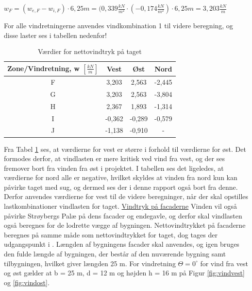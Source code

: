 \begin{center} 
	$w_F=(w_{e,F}-w_{i,F})\cdot 6,\!25 m = (0,\!339 \frac{kN}{m^2}\cdot (-0,\!174 \frac{kN}{m^2})\cdot 6,\!25 m = 3,\!203 \frac{kN}{m}$
\end{center}

For alle vindretningerne anvendes vindkombination 1 til videre beregning, og disse laster ses i tabellen nedenfor! 

\begin{table}[htb]
	\begin{center}
		\begin{tabular}{ |c|c|c|c| } 
			\hline
			Zone/Vindretning, w $[\frac{kN}{m}]$ & Vest & Øst & Nord \\	\hline
			F & 3,203 & 2,563 & -2,445 \\	\hline
			G & 3,203 & 2,563 & -3,804 \\	\hline 
			H & 2,367 & 1,893 & -1,314 \\ 	\hline
			I & -0,362 & -0,289 & -0,579 \\	\hline
			J & -1,138 & -0,910 & - \\	\hline
		\end{tabular}
		\caption{Værdier for nettovindtryk på taget}
		\label{tab:bb}
	\end{center}
\end{table}

Fra Tabel \ref{tab:bb} ses, at værdierne for vest er større i forhold til værdierne for øst. Det formodes derfor, at vindlasten er mere kritisk ved vind fra vest, og der ses fremover bort fra vinden fra øst i projektet. I tabellen ses det ligeledes, at værdierne for nord alle er negative, hvilket skyldes at vinden fra nord kun kan påvirke taget med sug, og dermed ses der i denne rapport også bort fra denne. 
\newline \indent{     }  Derfor anvendes værdierne for vest til de videre beregninger, når der skal opstilles lastkombinationer vindlasten for taget.
\newline
\newline
\underline{Vindtryk på facaderne}
\newline
Vinden vil også påvirke Strøybergs Palæ på dens facader og endegavle, og derfor skal vindlasten også beregnes for de lodrette vægge af bygningen.
\newline \indent{     }  Nettovindtrykket på facaderne beregnes på samme måde som nettovindtrykket for taget, dog tages der udgangspunkt i \citep[ tabel 7.1]{EU91}. Længden af bygningens facader skal anvendes, og igen bruges den fulde længde af bygningen, der består af den nuværende bygning samt tilbygningen, hvilket giver længden 25 m. 
\newline
\newline
For vindretning $\Theta = 0^{\circ}$ for vind fra vest og øst gælder at b = 25 m, d = 12 m og højden h = 16 m på Figur \ref{fig:vindvest} og \ref{fig:vindost}.

